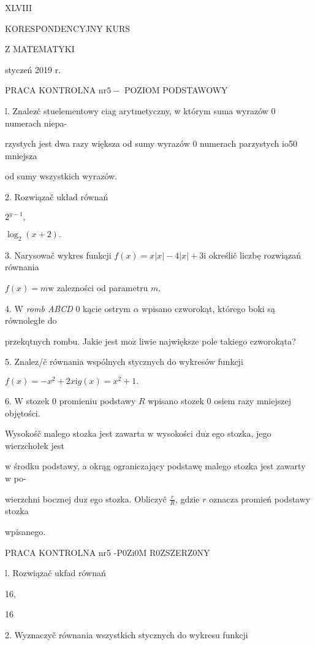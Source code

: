 \documentclass[a4paper,12pt]{article}
\begin{document}
XLVIII

KORESPONDENCYJNY KURS

Z MATEMATYKI

styczeń 2019 r.

PRACA KONTROLNA $\mathrm{n}\mathrm{r} 5-$ POZIOM PODSTAWOWY

l. Znalez$\acute{}$č stuelementowy ciag arytmetyczny, w którym suma wyrazów 0 numerach niepa-

rzystych jest dwa razy większa od sumy wyrazów 0 numerach parzystych io50 mniejsza

od sumy wszystkich wyrazów.

2. Rozwiązač układ równań 

$2^{y-1},$

$\log_{2}(x+2).$

3. Narysowač wykres funkcji $f(x) =x|x|-4|x|+3\mathrm{i}$ określič liczbę rozwiązań równania

$f(x)=m\mathrm{w}$ zalezności od parametru $m.$

4. $\mathrm{W}$ {\it romb ABCD} $0$ kącie ostrym $\alpha$ wpisano czworokąt, którego boki są równoległe do

przekqtnych rombu. Jakie jest $\mathrm{m}\mathrm{o}\dot{\mathrm{z}}$ liwie największe pole takiego czworokąta?

5. Znalez/č równania wspólnych stycznych do wykresów funkcji

$f(x)=-x^{2}+2x\mathrm{i}g(x)=x^{2}+1.$

6. $\mathrm{W}$ stozek $0$ promieniu podstawy $R$ wpisano stozek $0$ osiem razy mniejszej objętości.

Wysokośč malego stozka jest zawarta $\mathrm{w}$ wysokości $\mathrm{d}\mathrm{u}\dot{\mathrm{z}}$ ego stozka, jego wierzchołek jest

$\mathrm{w}$ środku podstawy, a okrąg ograniczający podstawę malego stozka jest zawarty $\mathrm{w}$ po-

wierzchni bocznej $\mathrm{d}\mathrm{u}\dot{\mathrm{z}}$ ego stozka. Obliczyč $\displaystyle \frac{r}{R}$, gdzie $r$ oznacza promień podstawy stozka

wpisanego.




PRACA KONTROLNA nr5 -P0Zi0M R0ZSZERZ0NY

l. Rozwiązač ukfad równań 

16,

16

2. Wyznaczyč równania wszystkich stycznych do wykresu funkcji
\end{document}
